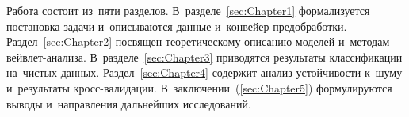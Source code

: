 Работа состоит из~пяти разделов.
В~разделе~\ref{sec:Chapter1} формализуется постановка задачи и~описываются
данные и~конвейер предобработки.
Раздел~\ref{sec:Chapter2} посвящен теоретическому описанию моделей и~методам
вейвлет-анализа.
В~разделе~\ref{sec:Chapter3} приводятся результаты классификации на~чистых данных.
Раздел~\ref{sec:Chapter4} содержит анализ устойчивости к~шуму и~результаты
кросс-валидации.
В~заключении~(\ref{sec:Chapter5}) формулируются выводы и~направления
дальнейших исследований.
